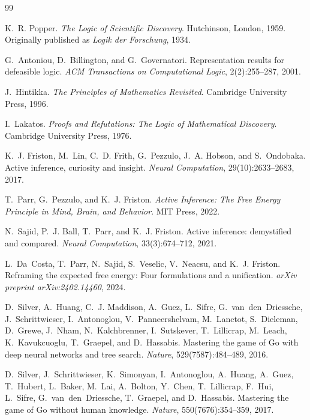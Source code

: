 \documentclass[11pt]{article}
\begin{document}
\begin{thebibliography}{99}

K.~R. Popper.
\newblock \emph{The Logic of Scientific Discovery}.
\newblock Hutchinson, London, 1959.
\newblock Originally published as \emph{Logik der Forschung}, 1934.

G.~Antoniou, D.~Billington, and G.~Governatori.
\newblock Representation results for defeasible logic.
\newblock \emph{ACM Transactions on Computational Logic}, 2(2):255--287, 2001.
 
J.~Hintikka.
\newblock \emph{The Principles of Mathematics Revisited}.
\newblock Cambridge University Press, 1996.
 
I.~Lakatos.
\newblock \emph{Proofs and Refutations: The Logic of Mathematical Discovery}.
\newblock Cambridge University Press, 1976.

K.~J. Friston, M.~Lin, C.~D. Frith, G.~Pezzulo, J.~A. Hobson, and S.~Ondobaka.
\newblock Active inference, curiosity and insight.
\newblock \emph{Neural Computation}, 29(10):2633--2683, 2017.

T.~Parr, G.~Pezzulo, and K.~J. Friston.
\newblock \emph{Active Inference: The Free Energy Principle in Mind, Brain, and Behavior}.
\newblock MIT Press, 2022.

N.~Sajid, P.~J. Ball, T.~Parr, and K.~J. Friston.
\newblock Active inference: demystified and compared.
\newblock \emph{Neural Computation}, 33(3):674--712, 2021.

L.~Da~Costa, T.~Parr, N.~Sajid, S.~Veselic, V.~Neacsu, and K.~J. Friston.
\newblock Reframing the expected free energy: Four formulations and a unification.
\newblock \emph{arXiv preprint arXiv:2402.14460}, 2024.

D.~Silver, A.~Huang, C.~J. Maddison, A.~Guez, L.~Sifre, G.~van~den~Driessche, J.~Schrittwieser, I.~Antonoglou, V.~Panneershelvam, M.~Lanctot, S.~Dieleman, D.~Grewe, J.~Nham, N.~Kalchbrenner, I.~Sutskever, T.~Lillicrap, M.~Leach, K.~Kavukcuoglu, T.~Graepel, and D.~Hassabis.
\newblock Mastering the game of {G}o with deep neural networks and tree search.
\newblock \emph{Nature}, 529(7587):484--489, 2016.

D.~Silver, J.~Schrittwieser, K.~Simonyan, I.~Antonoglou, A.~Huang, A.~Guez, T.~Hubert, L.~Baker, M.~Lai, A.~Bolton, Y.~Chen, T.~Lillicrap, F.~Hui, L.~Sifre, G.~van~den~Driessche, T.~Graepel, and D.~Hassabis.
\newblock Mastering the game of {G}o without human knowledge.
\newblock \emph{Nature}, 550(7676):354--359, 2017.


\end{thebibliography}
\end{document}
